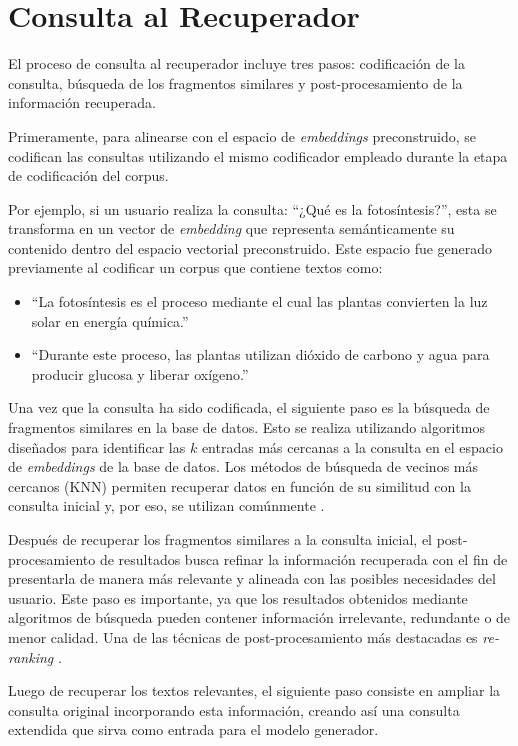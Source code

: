 \documentclass{article}
\begin{document}
\section{Consulta al Recuperador}

El proceso de consulta al recuperador incluye tres pasos: codificación de la consulta, búsqueda de los fragmentos similares y post-procesamiento de la información recuperada.

Primeramente, para alinearse con el espacio de \textit{embeddings} preconstruido, se codifican las consultas utilizando el mismo codificador empleado durante la etapa de codificación del corpus.

Por ejemplo, si un usuario realiza la consulta:
``¿Qué es la fotosíntesis?'', esta se transforma en un vector de \textit{embedding} que representa semánticamente su contenido dentro del espacio vectorial preconstruido. Este espacio fue generado previamente al codificar un corpus que contiene textos como:
\begin{itemize} 
    \item ``La fotosíntesis es el proceso mediante el cual las plantas convierten la luz solar en energía química.'' 
    \item ``Durante este proceso, las plantas utilizan dióxido de carbono y agua para producir glucosa y liberar oxígeno.''
\end{itemize}

Una vez que la consulta ha sido codificada, el siguiente paso es la búsqueda de fragmentos similares en la base de datos. Esto se realiza utilizando algoritmos diseñados para identificar las \(k\) entradas más cercanas a la consulta en el espacio de \textit{embeddings} de la base de datos. Los métodos de búsqueda de vecinos más cercanos (KNN) permiten recuperar datos en función de su similitud con la consulta inicial y, por eso, se utilizan comúnmente \cite{johnson2021billion}.

Después de recuperar los fragmentos similares a la consulta inicial, el post-procesamiento de resultados busca refinar la información recuperada con el fin de presentarla de manera más relevante y alineada con las posibles necesidades del usuario. Este paso es importante, ya que los resultados obtenidos mediante algoritmos de búsqueda pueden contener información irrelevante, redundante o de menor calidad. Una de las técnicas de post-procesamiento más destacadas es \textit{re-ranking} \cite{mortaheb2025rerankingcontextmultimodalretrieval}.

Luego de recuperar los textos relevantes, el siguiente paso consiste en ampliar la consulta original incorporando esta información, creando así una consulta extendida que sirva como entrada para el modelo generador.
\end{document}
